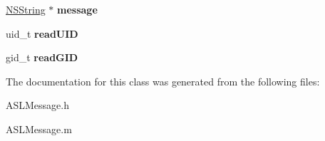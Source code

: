 \begin{DoxyCompactItemize}
\item 
\hypertarget{interface_a_s_l_message_a7a6f836d7e8cd47a1f14a1823ca0e549}{
\hyperlink{class_n_s_string}{NSString} $\ast$ {\bfseries message}}
\label{interface_a_s_l_message_a7a6f836d7e8cd47a1f14a1823ca0e549}

\item 
\hypertarget{interface_a_s_l_message_a741e717d87a00fa254cb8aad82a0789c}{
uid\_\-t {\bfseries readUID}}
\label{interface_a_s_l_message_a741e717d87a00fa254cb8aad82a0789c}

\item 
\hypertarget{interface_a_s_l_message_a521a192e780a64189127ce7bf3ea1a2b}{
gid\_\-t {\bfseries readGID}}
\label{interface_a_s_l_message_a521a192e780a64189127ce7bf3ea1a2b}

\end{DoxyCompactItemize}


The documentation for this class was generated from the following files:\begin{DoxyCompactItemize}
\item 
ASLMessage.h\item 
ASLMessage.m\end{DoxyCompactItemize}

